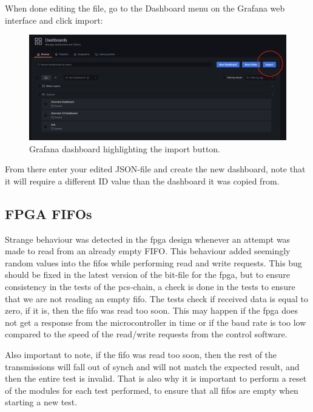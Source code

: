 \documentclass[main.tex]{subfiles}
\begin{document}
When done editing the file, go to the Dashboard menu on the Grafana web interface and click import:

\begin{figure}[!ht]
    \centering
    \includegraphics[scale=0.4]{images/grafana_import.png}
    \caption{Grafana dashboard highlighting the import button.}
    \label{fig: grafana_import}
\end{figure}
\FloatBarrier 

From there enter your edited JSON-file and create the new dashboard, note that it will require a different ID value than the dashboard it was copied from.


\subsection{FPGA FIFOs}

Strange behaviour was detected in the \gls{fpga} design whenever an attempt was made to read from an already empty FIFO. This behaviour added seemingly random values into the \gls{fifo}s while performing read and write requests. This bug should be fixed in the latest version of the bit-file for the \gls{fpga}, but to ensure consistency in the tests of the \gls{pcs}-chain, a check is done in the tests to ensure that we are not reading an empty \gls{fifo}. The tests check if received data is equal to zero, if it is, then the \gls{fifo} was read too soon. This may happen if the \gls{fpga} does not get a response from the microcontroller in time or if the baud rate is too low compared to the speed of the read/write requests from the control software.

Also important to note, if the \gls{fifo} was read too soon, then the rest of the transmissions will fall out of synch and will not match the expected result, and then the entire test is invalid. That is also why it is important to perform a reset of the modules for each test performed, to ensure that all \gls{fifo}s are empty when starting a new test.

\end{document}
